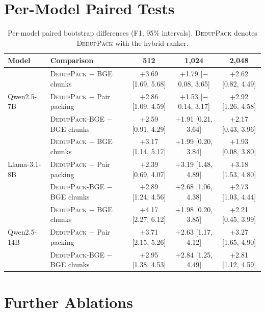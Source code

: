 \documentclass[11pt]{article}
\newcommand{\spk}{\textsc{DedupPack}}
\begin{document}
\section{Per-Model Paired Tests}
\label{app:permodel}

\begin{table}[t]
\centering
\small
\begin{tabular}{llccc}
\toprule
Model & Comparison & 512 & 1,024 & 2,048 \\
\midrule
\multirow{3}{*}{Qwen2.5-7B}
 & \spk{} $-$ BGE chunks & +3.69 [1.69, 5.68] & +1.79 [$-$0.08, 3.65] & +2.62 [0.82, 4.49] \\
 & \spk{} $-$ Pair packing & +2.86 [1.09, 4.59] & +1.53 [$-$0.14, 3.17] & +2.92 [1.26, 4.58] \\
 & \spk{}-BGE $-$ BGE chunks & +2.59 [0.91, 4.29] & +1.91 [0.21, 3.64] & +2.17 [0.43, 3.96] \\
\midrule
\multirow{3}{*}{Llama-3.1-8B}
 & \spk{} $-$ BGE chunks & +3.17 [1.14, 5.17] & +1.99 [0.20, 3.84] & +1.93 [0.08, 3.80] \\
 & \spk{} $-$ Pair packing & +2.39 [0.69, 4.07] & +3.19 [1.48, 4.89] & +3.18 [1.53, 4.80] \\
 & \spk{}-BGE $-$ BGE chunks & +2.89 [1.24, 4.56] & +2.68 [1.06, 4.38] & +2.73 [1.03, 4.44] \\
\midrule
\multirow{3}{*}{Qwen2.5-14B}
 & \spk{} $-$ BGE chunks & +4.17 [2.27, 6.12] & +1.98 [0.20, 3.85] & +2.21 [0.45, 3.99] \\
 & \spk{} $-$ Pair packing & +3.71 [2.15, 5.26] & +2.63 [1.17, 4.12] & +3.27 [1.65, 4.90] \\
 & \spk{}-BGE $-$ BGE chunks & +2.95 [1.38, 4.53] & +2.84 [1.25, 4.49] & +2.81 [1.12, 4.59] \\
\bottomrule
\end{tabular}
\caption{Per-model paired bootstrap differences (F1, 95\% intervals). \spk{} denotes \spk{} with the hybrid ranker.}
\label{tab:permodel}
\end{table}

\section{Further Ablations}
\label{app:ablation}
\end{document}
